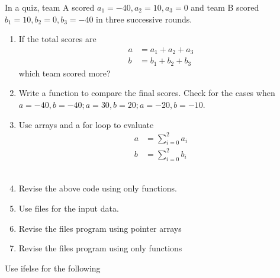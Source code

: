 In a quiz, team A scored $a_1 = -40, a_2=10, a_3=0$ and team B scored $b_1=10, b_2=0, b_3=-40$ in three successive rounds.
\begin{enumerate}[label=\thesection.\arabic*, ref=\thesection.\theenumi]
\item  If the total scores are 
	\begin{align}
		a &= a_1+a_2+a_3
		\\
		b &= b_1+b_2+b_3
	\end{align}
	which team scored more? 
	\\
	\solution 
	
\item Write a function to compare the final scores.  Check for the cases when $a = -40, b = -40; a = 30, b = 20; a = -20, b = -10$.
	\\
	\solution 
	
\item Use arrays and a for loop to evaluate 
	\begin{align}
		a &= \sum_{i=0}^{2}a_i
		\\
		b &= \sum_{i=0}^{2}b_i
	\end{align}
	\\
	\solution 
	
\item Revise the above code using only functions.
	\\
	\solution 
	
\item Use files for the input data.
	\\
	\solution 
	
\item Revise the files program using pointer arrays
	\\
	\solution 
	
\item Revise the files program using only functions
	\\
	\solution 
	
\end{enumerate}
Use ifelse  for the following
